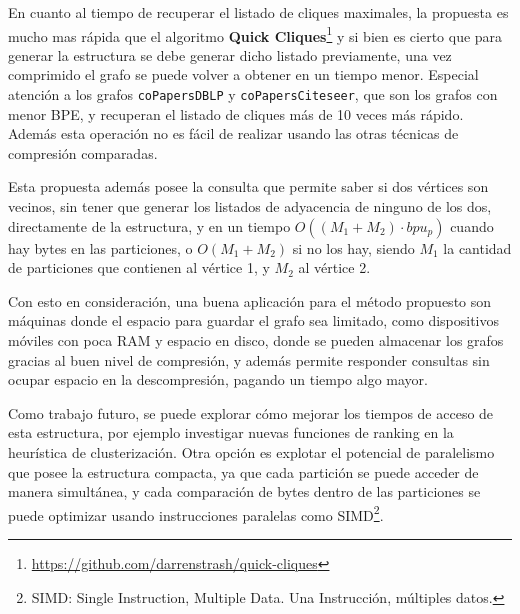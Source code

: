 En cuanto al tiempo de recuperar el listado de cliques maximales, la propuesta es mucho mas rápida que el algoritmo \textbf{Quick Cliques}\footnote{\url{https://github.com/darrenstrash/quick-cliques}} y si bien es cierto que para generar la estructura se debe generar dicho listado previamente, una vez comprimido el grafo se puede volver a obtener en un tiempo menor. Especial atención a los grafos \texttt{coPapersDBLP} y \texttt{coPapersCiteseer}, que son los grafos con menor BPE, y recuperan el listado de cliques más de 10 veces más rápido. Además esta operación no es fácil de realizar usando las otras técnicas de compresión comparadas.

Esta propuesta además posee la consulta que permite saber si dos vértices son vecinos, sin tener que generar los listados de adyacencia de ninguno de los dos, directamente de la estructura, y en un tiempo  $O((M_{1} + M_{2}) \cdot bpu_{p})$ cuando hay bytes en las particiones, o $O(M_{1} + M_{2})$ si no los hay, siendo $M_{1}$ la cantidad de particiones que contienen al vértice 1, y $M_{2}$ al vértice 2. 

Con esto en consideración, una buena aplicación para el método propuesto son máquinas donde el espacio para guardar el grafo sea limitado, como dispositivos móviles con poca RAM y espacio en disco, donde se pueden almacenar los grafos gracias al buen nivel de compresión, y además permite responder consultas sin ocupar espacio en la descompresión, pagando un tiempo algo mayor.

Como trabajo futuro, se puede explorar cómo mejorar los tiempos de acceso de esta estructura, por ejemplo investigar nuevas funciones de ranking en la heurística de clusterización. Otra opción es explotar el potencial de paralelismo que posee la estructura compacta, ya que cada partición se puede acceder de manera simultánea, y cada comparación de bytes dentro de las particiones se puede optimizar usando instrucciones paralelas como SIMD\footnote{SIMD: Single Instruction, Multiple Data. Una Instrucción, múltiples datos.}.

